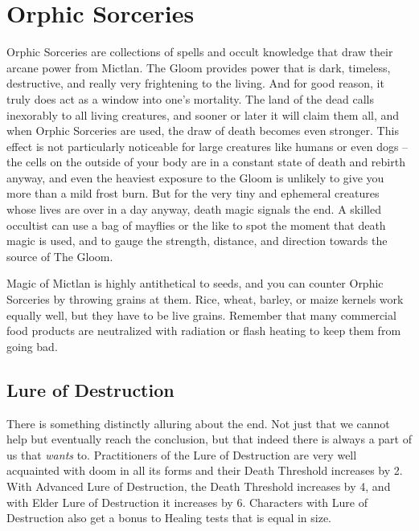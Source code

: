 \section{Orphic Sorceries}

\hspace{\parindent} Orphic Sorceries are collections of spells and occult knowledge that draw their arcane power from Mictlan. The Gloom provides power that is dark, timeless, destructive, and really very frightening to the living. And for good reason, it truly does act as a window into one's mortality. The land of the dead calls inexorably to all living creatures, and sooner or later it will claim them all, and when Orphic Sorceries are used, the draw of death becomes even stronger. This effect is not particularly noticeable for large creatures like humans or even dogs -- the cells on the outside of your body are in a constant state of death and rebirth anyway, and even the heaviest exposure to the Gloom is unlikely to give you more than a mild frost burn. But for the very tiny and ephemeral creatures whose lives are over in a day anyway, death magic signals the end. A skilled occultist can use a bag of mayflies or the like to spot the moment that death magic is used, and to gauge the strength, distance, and direction towards the source of The Gloom.

Magic of Mictlan is highly antithetical to seeds, and you can counter Orphic Sorceries by throwing grains at them. Rice, wheat, barley, or maize kernels work equally well, but they have to be live grains. Remember that many commercial food products are neutralized with radiation or flash heating to keep them from going bad.

\subsection{Lure of Destruction}

There is something distinctly alluring about the end. Not just that we cannot help but eventually reach the conclusion, but that indeed there is always a part of us that \textit{wants} to. Practitioners of the Lure of Destruction are very well acquainted with doom in all its forms and their Death Threshold increases by 2. With Advanced Lure of Destruction, the Death Threshold increases by 4, and with Elder Lure of Destruction it increases by 6. Characters with Lure of Destruction also get a bonus to Healing tests that is equal in size.

